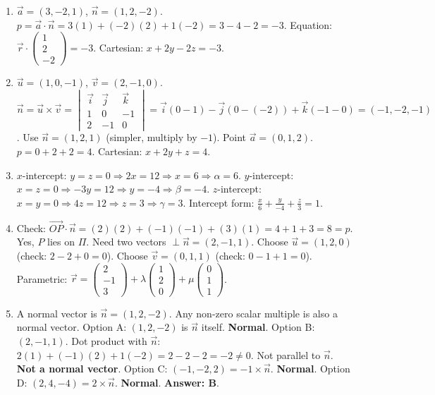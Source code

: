 \documentclass[11pt]{article}
\begin{document}
\begin{corrige}[Exercise 1]
\begin{enumerate}
    \item $\vec{a} = (3, -2, 1)$, $\vec{n} = (1, 2, -2)$. $p = \vec{a}\cdot\vec{n} = 3(1) + (-2)(2) + 1(-2) = 3 - 4 - 2 = -3$.
    Equation: $\vec{r}\cdot\begin{pmatrix} 1 \\ 2 \\ -2 \end{pmatrix} = -3$. Cartesian: $x + 2y - 2z = -3$.
    \item $\vec{u} = (1, 0, -1)$, $\vec{v} = (2, -1, 0)$. $\vec{n} = \vec{u}\times\vec{v} = \begin{vmatrix} \vec{i} & \vec{j} & \vec{k} \\ 1 & 0 & -1 \\ 2 & -1 & 0 \end{vmatrix} = \vec{i}(0 - 1) - \vec{j}(0 - (-2)) + \vec{k}(-1 - 0) = (-1, -2, -1)$.
    Use $\vec{n} = (1, 2, 1)$ (simpler, multiply by $-1$). Point $\vec{a} = (0, 1, 2)$. $p = 0 + 2 + 2 = 4$.
    Cartesian: $x + 2y + z = 4$.
    \item $x$-intercept: $y=z=0 \Rightarrow 2x=12 \Rightarrow x=6 \Rightarrow \alpha=6$.
    $y$-intercept: $x=z=0 \Rightarrow -3y=12 \Rightarrow y=-4 \Rightarrow \beta=-4$.
    $z$-intercept: $x=y=0 \Rightarrow 4z=12 \Rightarrow z=3 \Rightarrow \gamma=3$.
    Intercept form: $\frac{x}{6} + \frac{y}{-4} + \frac{z}{3} = 1$.
    \item Check: $\vec{OP}\cdot\vec{n} = (2)(2) + (-1)(-1) + (3)(1) = 4 + 1 + 3 = 8 = p$. Yes, $P$ lies on $\Pi$.
    Need two vectors $\perp \vec{n}=(2,-1,1)$. Choose $\vec{u}=(1,2,0)$ (check: $2-2+0=0$). Choose $\vec{v}=(0,1,1)$ (check: $0-1+1=0$).
    Parametric: $\vec{r} = \begin{pmatrix} 2 \\ -1 \\ 3 \end{pmatrix} + \lambda \begin{pmatrix} 1 \\ 2 \\ 0 \end{pmatrix} + \mu \begin{pmatrix} 0 \\ 1 \\ 1 \end{pmatrix}$.
    \item A normal vector is $\vec{n} = (1, 2, -2)$. Any non-zero scalar multiple is also a normal vector.
    Option A: $(1, 2, -2)$ is $\vec{n}$ itself. \textbf{Normal}.
    Option B: $(2, -1, 1)$. Dot product with $\vec{n}$: $2(1) + (-1)(2) + 1(-2) = 2 - 2 - 2 = -2 \neq 0$. Not parallel to $\vec{n}$. \textbf{Not a normal vector}.
    Option C: $(-1, -2, 2) = -1 \times \vec{n}$. \textbf{Normal}.
    Option D: $(2, 4, -4) = 2 \times \vec{n}$. \textbf{Normal}.
    \textbf{Answer: B}.
\end{enumerate}
\end{corrige}
\end{document}
